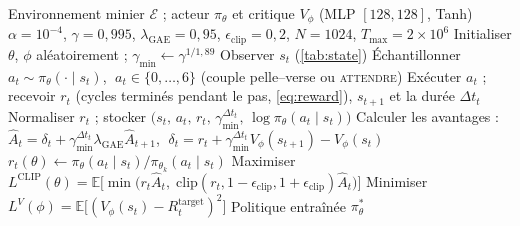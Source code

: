 \documentclass[11pt,a4paper]{article}
\begin{document}
\begin{algorithm}[H]
\caption{PPO pour le dispatching de camions miniers}
\label{alg:ppo}
\begin{algorithmic}[1]
\Require Environnement minier $\mathcal{E}$ ; acteur $\pi_\theta$ et critique $V_\phi$ (MLP $[128,128]$, Tanh)
\Require $\alpha{=}10^{-4}$, $\gamma{=}0{,}995$, $\lambda_{\text{GAE}}{=}0{,}95$, $\epsilon_{\text{clip}}{=}0{,}2$, $N{=}1024$, $T_{\max}{=}2{\times}10^6$
\State Initialiser $\theta$, $\phi$ aléatoirement ; $\gamma_{\min}\leftarrow\gamma^{1/1{,}89}$
   
    \State Observer $s_t$ (\cref{tab:state})
    \State Échantillonner $a_t \sim \pi_\theta(\cdot\mid s_t)$, $\;a_t\in\{0,\ldots,6\}$ (couple pelle--verse ou \textsc{attendre})
    \State Exécuter $a_t$ ; recevoir $r_t$ (cycles terminés pendant le pas, \cref{eq:reward}), $s_{t+1}$ et la durée $\Delta t_t$
    \State Normaliser $r_t$ ; stocker $\bigl(s_t,\,a_t,\,r_t,\,\gamma_{\min}^{\Delta t_t},\,\log\pi_\theta(a_t\mid s_t)\bigr)$
  \EndFor
  \State Calculer les avantages : $\hat{A}_t = \delta_t + \gamma_{\min}^{\Delta t_t}\lambda_{\text{GAE}}\hat{A}_{t+1}$,
         $\;\delta_t = r_t + \gamma_{\min}^{\Delta t_t} V_\phi(s_{t+1}) - V_\phi(s_t)$
    \State $r_t(\theta)\leftarrow \pi_\theta(a_t\mid s_t)/\pi_{\theta_k}(a_t\mid s_t)$
    \State Maximiser $L^{\text{CLIP}}(\theta)=\mathbb{E}\bigl[\min\bigl(r_t\hat{A}_t,\;\mathrm{clip}(r_t,1{-}\epsilon_{\text{clip}},1{+}\epsilon_{\text{clip}})\hat{A}_t\bigr)\bigr]$
    \State Minimiser $L^{V}(\phi)=\mathbb{E}\bigl[(V_\phi(s_t)-R_t^{\text{target}})^2\bigr]$
  \EndFor
\EndFor
\Ensure Politique entraînée $\pi_\theta^*$
\end{algorithmic}
\end{algorithm}
\end{document}
